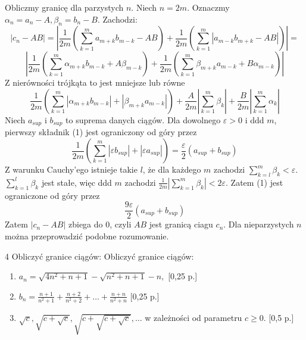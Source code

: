 \documentclass{../note}
\begin{document}
\begin{rozwiazanie}
Obliczmy granicę dla parzystych $n$. Niech $n = 2m$. Oznaczmy $\alpha_n = a_n - A, \beta_n = b_n - B$. Zachodzi:
\[|c_n - AB| = \left|\frac1{2m}\left(\sum_{k=1}^{m}a_{m+k}b_{m-k} - AB\right) + \frac1{2m}\left(\sum_{k=1}^{m}|a_{m-k}b_{m+k} - AB|\right)\right| =\]
\[\left|\frac1{2m}\left(\sum_{k=1}^{m}\alpha_{m+k}b_{m-k} + A\beta_{m-k}\right) + \frac1{2m}\left(\sum_{k=1}^{m}\beta_{m+k}a_{m-k} + B\alpha_{m-k}\right)\right|\]
Z nierówności trójkąta to jest mniejsze lub równe
\begin{equation}
\frac{1}{2m}\left(\sum_{k=1}^{m}|\alpha_{m+k}b_{m-k}| + |\beta_{m+k}a_{m-k}|\right) + \frac{A}{2m}\left|\sum_{k=1}^{m}\beta_k\right| + \frac{B}{2m}\left|\sum_{k=1}^{m}\alpha_k\right|
\end{equation}
Niech $a_{sup}$ i $b_{sup}$ to suprema danych ciągów. Dla dowolnego $\varepsilon > 0$ i ddd $m$, pierwszy składnik (1) jest ograniczony od góry przez
\[\frac{1}{2m}\left(\sum_{k=1}^{m}|\varepsilon b_{sup}| + |\varepsilon a_{sup}|\right) = \frac{\varepsilon}{2}(a_{sup} + b_{sup})\]
Z warunku Cauchy'ego istnieje takie $l$, że dla każdego $m$ zachodzi $\sum_{k=l}^{m}\beta_k < \varepsilon$. $\sum_{k=1}^{l}\beta_k$ jest stałe, więc ddd $m$ zachodzi $\frac1{2m}\left|\sum_{k=1}^{m}\beta_k\right| < 2\varepsilon$. Zatem (1) jest ograniczone od góry przez 
\[\frac{9\varepsilon}{2}(a_{sup} + b_{sup})\]
Zatem $|c_n - AB|$ zbiega do 0, czyli $AB$ jest granicą ciagu $c_n$. Dla nieparzystych $n$ można przeprowadzić podobne rozumowanie.
\end{rozwiazanie}
\begin{zadanie}{4}
Obliczyć granice ciągów:
Obliczyć granice ciągów:
\begin{enumerate}[label=(\alph*)]
    \item $a_{n}=\sqrt{4n^{2}+n+1}-\sqrt{n^{2}+n+1}-n,$ \hfill [0,25 p.]
    \item $b_{n}=\frac{n+1}{n^{2}+1}+\frac{n+2}{n^{2}+2}+\dots+\frac{n+n}{n^{2}+n}$ \hfill [0,25 p.]
    \item $\sqrt{c},\sqrt{c+\sqrt{c}},\sqrt{c+\sqrt{c+\sqrt{c}}}, \dots$ w zależności od parametru $c\ge0$. \hfill [0,5 p.] \\
    
\end{enumerate}
\end{zadanie}
\end{document}
